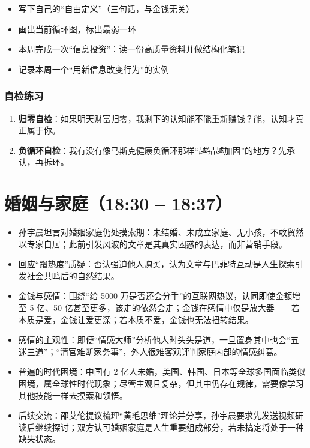 \begin{itemize}
\tightlist
\item[$\square$]
  写下自己的``自由定义''（三句话，与金钱无关）
\item[$\square$]
  画出当前循环图，标出最弱一环
\item[$\square$]
  本周完成一次``信息投资''：读一份高质量资料并做结构化笔记
\item[$\square$]
  记录本周一个``用新信息改变行为''的实例
\end{itemize}

\subsubsection{自检练习}

\begin{enumerate}
\def\labelenumi{\arabic{enumi}.}
\tightlist
\item
  \textbf{归零自检}：如果明天财富归零，我剩下的认知能不能重新赚钱？能，认知才真正属于你。
\item
  \textbf{负循环自检}：我有没有像马斯克健康负循环那样``越错越加固''的地方？先承认，再拆环。
\end{enumerate}

\section{婚姻与家庭（18:30 --
18:37）}

\begin{itemize}
\tightlist
\item
  孙宇晨坦言对婚姻家庭仍处摸索期：未结婚、未成立家庭、无小孩，不敢贸然以专家自居；此前引发风波的文章是其真实困惑的表达，而非营销手段。
\item
  回应``蹭热度''质疑：否认强迫他人购买，认为文章与巴菲特互动是人生探索引发社会共鸣后的自然结果。
\item
  金钱与感情：围绕``给 5000
  万是否还会分手''的互联网热议，认同即使金额增至 5 亿、50
  亿甚至更多，该走的依然会走；金钱在感情中仅是放大器------若本质是爱，金钱让爱更深；若本质不爱，金钱也无法扭转结果。
\item
  感情的主观性：即便``情感大师''分析他人时头头是道，一旦置身其中也会``五迷三道''；``清官难断家务事''，外人很难客观评判家庭内部的情感纠葛。
\item
  普遍的时代困境：中国有 2
  亿人未婚，美国、韩国、日本等全球多国面临类似困境，属全球性时代现象；尽管主观且复杂，但其中仍存在规律，需要像学习其他技能一样去摸索和领悟。
\item
  后续交流：邵艾伦提议梳理``黄毛思维''理论并分享，孙宇晨要求先发送视频研读后继续探讨；双方认可婚姻家庭是人生重要组成部分，若未搞定将处于一种缺失状态。
\end{itemize}

